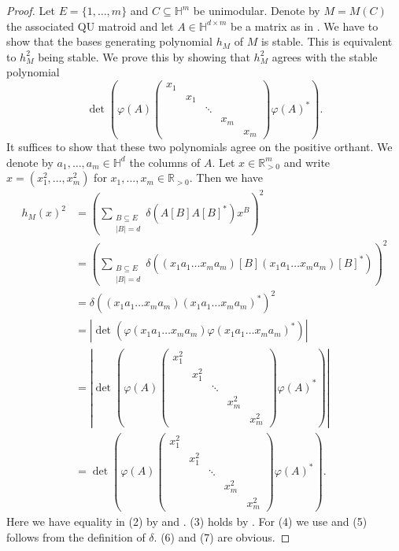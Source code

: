 \documentclass[11pt]{article}
\theoremstyle{definition}
\numberwithin{equation}{section}
\newcommand{\R}{{\mathbb R}}
\newcommand{\HH}{{\mathbb H}}
\begin{document}
\begin{proof}
  Let $E=\{1,\ldots,m\}$ and $C\subseteq\HH^m$ be unimodular. Denote by $M=M(C)$ the associated QU matroid and let $A\in\HH^{d\times m}$ be a matrix as in . We have to show that the bases generating polynomial $h_M$ of $M$ is stable. This is equivalent to $h_M^2$ being stable. We prove this by showing that $h_M^2$ agrees with the stable polynomial
  \begin{equation*}
    \det\left(\varphi(A)\begin{pmatrix}x_1&&&&\\&x_1&&&\\&&\ddots&&\\&&&x_m&\\&&&&x_m\end{pmatrix}\varphi(A)^*\right).  
  \end{equation*}
    It suffices to show that these two polynomials agree on the positive orthant. We denote by $a_1,\ldots,a_m\in\HH^d$ the columns of $A$. Let $x\in\R_{>0}^m$ and write $x=(x_1^2,\ldots,x_m^2)$ for $x_1,\ldots,x_m\in\R_{>0}$. Then we have
    \allowdisplaybreaks\begin{align}
        h_M(x)^2&=\left(\sum_{\substack{B\subseteq E\\|B|=d}}\delta(A[B]A[B]^*)x^B\right)^2\\
        &=\left(\sum_{\substack{B\subseteq E\\|B|=d}}\delta((x_1a_1\ldots x_ma_m)[B](x_1a_1\ldots x_ma_m)[B]^*)\right)^2\\
        &=\delta((x_1a_1\ldots x_ma_m)(x_1a_1\ldots x_ma_m)^*)^2\\
        &=|\det(\varphi(x_1a_1\ldots x_ma_m)\varphi(x_1a_1\ldots x_ma_m)^*)|\\
        &=|\det\left(\varphi(A)\begin{pmatrix}x_1^2&&&&\\&x_1^2&&&\\
        &&\ddots&&\\&&&x_m^2&\\&&&&x_m^2\end{pmatrix}\varphi(A)^*\right)|\\
        &=\det\left(\varphi(A)\begin{pmatrix}x_1^2&&&&\\&x_1^2&&&\\
        &&\ddots&&\\&&&x_m^2&\\&&&&x_m^2\end{pmatrix}\varphi(A)^*\right).
    \end{align}
    Here we have equality in (2) by  and . (3) holds  by . For (4) we use  and (5) follows from the definition of $\delta$. (6) and (7) are obvious.
\end{proof}
\end{document}
